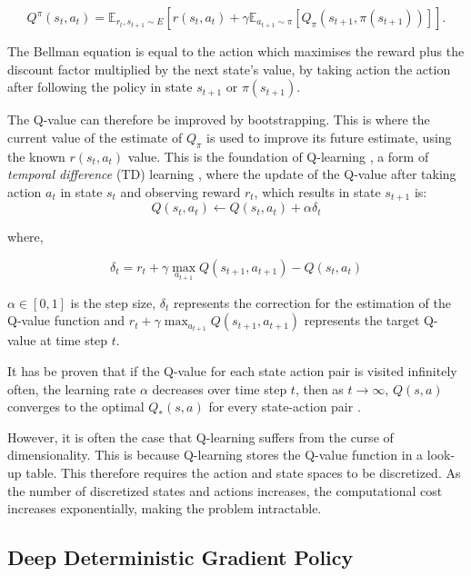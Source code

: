 \begin{dmath}
	\label{eq:bellman}
	Q^\pi(s_t,a_t)=\mathbb{E}_{{r_t},s_{t+1}\sim E} [r(s_t,a_t)+
	\gamma\mathbb{E}_{a_{t+1}\sim \pi}[Q_\pi(s_{t+1},\pi(s_{t+1}))]].
\end{dmath}

\noindent The Bellman equation is equal to the action which maximises the reward plus the discount factor multiplied by the next state's value, by taking action the action after following the policy in state $s_{t+1}$ or $\pi(s_{t+1})$.

The Q-value can therefore be improved by bootstrapping. This is where the current value of the estimate of $Q_\pi$ is used to improve its future estimate, using the known $r(s_t,a_t)$ value. This is the foundation of Q-learning \cite{Gay2007}, a form of \textit{temporal difference} (TD) learning \cite{Sutton2015}, where the update of the Q-value after taking action $a_t$ in state $s_t$ and observing reward $r_t$, which results in state $s_{t+1}$ is:
\begin{equation}
Q(s_t,a_t)\leftarrow Q(s_t,a_t)+\alpha\delta_t
\end{equation}

\noindent where,

\begin{equation}
\delta_t=r_t+\gamma\max_{a_{t+1}}Q(s_{t+1},a_{t+1})-Q(s_{t},a_t)
\end{equation}

\noindent $\alpha\in [0,1]$ is the step size, $\delta_t$ represents the correction for the estimation of the Q-value function and $r_t+\gamma\max_{a_{t+1}}Q(s_{t+1},a_{t+1})$ represents the target Q-value at time step $t$.	


It has be proven that if the Q-value for each state action pair is visited infinitely often, the learning rate $\alpha$ decreases over time step $t$, then as $t\rightarrow \infty$, $Q(s,a)$ converges to the optimal $Q_*(s,a)$ for every state-action pair \cite{Gay2007}.

However, it is often the case that Q-learning suffers from the curse of dimensionality. This is because Q-learning stores the Q-value function in a look-up table. This therefore requires the action and state spaces to be discretized. As the number of discretized states and actions increases, the computational cost increases exponentially, making the problem intractable. 

\subsection{Deep Deterministic Gradient Policy}


